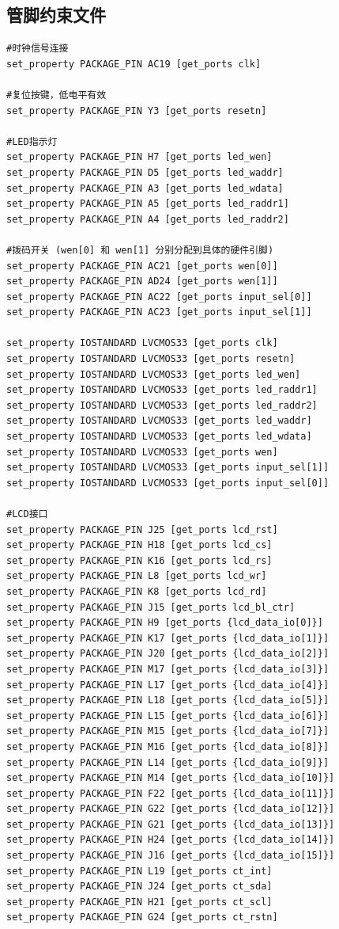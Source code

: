 \documentclass[12pt,a4paper]{article}
\begin{document}
\subsection{管脚约束文件}
\begin{lstlisting}[language=XDC]
#时钟信号连接
set_property PACKAGE_PIN AC19 [get_ports clk]

#复位按键，低电平有效
set_property PACKAGE_PIN Y3 [get_ports resetn]

#LED指示灯
set_property PACKAGE_PIN H7 [get_ports led_wen]
set_property PACKAGE_PIN D5 [get_ports led_waddr]
set_property PACKAGE_PIN A3 [get_ports led_wdata]
set_property PACKAGE_PIN A5 [get_ports led_raddr1]
set_property PACKAGE_PIN A4 [get_ports led_raddr2]

#拨码开关 (wen[0] 和 wen[1] 分别分配到具体的硬件引脚)
set_property PACKAGE_PIN AC21 [get_ports wen[0]]
set_property PACKAGE_PIN AD24 [get_ports wen[1]] 
set_property PACKAGE_PIN AC22 [get_ports input_sel[0]]
set_property PACKAGE_PIN AC23 [get_ports input_sel[1]]

set_property IOSTANDARD LVCMOS33 [get_ports clk]
set_property IOSTANDARD LVCMOS33 [get_ports resetn]
set_property IOSTANDARD LVCMOS33 [get_ports led_wen]
set_property IOSTANDARD LVCMOS33 [get_ports led_raddr1]
set_property IOSTANDARD LVCMOS33 [get_ports led_raddr2]
set_property IOSTANDARD LVCMOS33 [get_ports led_waddr]
set_property IOSTANDARD LVCMOS33 [get_ports led_wdata]
set_property IOSTANDARD LVCMOS33 [get_ports wen]
set_property IOSTANDARD LVCMOS33 [get_ports input_sel[1]]
set_property IOSTANDARD LVCMOS33 [get_ports input_sel[0]]

#LCD接口
set_property PACKAGE_PIN J25 [get_ports lcd_rst]
set_property PACKAGE_PIN H18 [get_ports lcd_cs]
set_property PACKAGE_PIN K16 [get_ports lcd_rs]
set_property PACKAGE_PIN L8 [get_ports lcd_wr]
set_property PACKAGE_PIN K8 [get_ports lcd_rd]
set_property PACKAGE_PIN J15 [get_ports lcd_bl_ctr]
set_property PACKAGE_PIN H9 [get_ports {lcd_data_io[0]}]
set_property PACKAGE_PIN K17 [get_ports {lcd_data_io[1]}]
set_property PACKAGE_PIN J20 [get_ports {lcd_data_io[2]}]
set_property PACKAGE_PIN M17 [get_ports {lcd_data_io[3]}]
set_property PACKAGE_PIN L17 [get_ports {lcd_data_io[4]}]
set_property PACKAGE_PIN L18 [get_ports {lcd_data_io[5]}]
set_property PACKAGE_PIN L15 [get_ports {lcd_data_io[6]}]
set_property PACKAGE_PIN M15 [get_ports {lcd_data_io[7]}]
set_property PACKAGE_PIN M16 [get_ports {lcd_data_io[8]}]
set_property PACKAGE_PIN L14 [get_ports {lcd_data_io[9]}]
set_property PACKAGE_PIN M14 [get_ports {lcd_data_io[10]}]
set_property PACKAGE_PIN F22 [get_ports {lcd_data_io[11]}]
set_property PACKAGE_PIN G22 [get_ports {lcd_data_io[12]}]
set_property PACKAGE_PIN G21 [get_ports {lcd_data_io[13]}]
set_property PACKAGE_PIN H24 [get_ports {lcd_data_io[14]}]
set_property PACKAGE_PIN J16 [get_ports {lcd_data_io[15]}]
set_property PACKAGE_PIN L19 [get_ports ct_int]
set_property PACKAGE_PIN J24 [get_ports ct_sda]
set_property PACKAGE_PIN H21 [get_ports ct_scl]
set_property PACKAGE_PIN G24 [get_ports ct_rstn]


\end{lstlisting}
\end{document}
